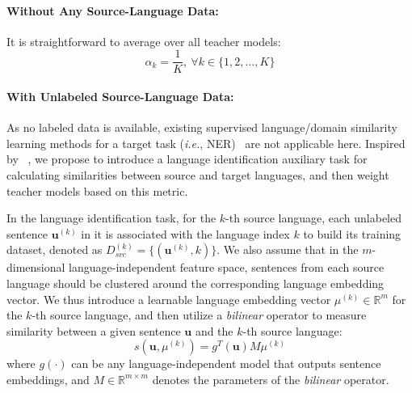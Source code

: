 \documentclass[11pt,a4paper]{article}
\newcommand\ie{\textit{i.e.}}
\begin{document}
	\paragraph{Without Any Source-Language Data: } 
It is straightforward to average over all teacher models:
	\begin{equation}
	\label{equ:minimal_resource}
	\alpha_k = \frac{1}{K}, ~\forall k \in \{1, 2, \ldots, K\}
	\end{equation}
	
	\paragraph{With Unlabeled Source-Language Data: } 
As no labeled data is available, existing supervised language/domain similarity learning methods for a target task (\ie, NER)~\cite{mcclosky2010} are not applicable here. Inspired by ~\citet{pinheiro2018unsupervised}, we propose to introduce a language identification auxiliary task for calculating similarities between source and target languages, and then weight teacher models based on this metric. 

	In the language identification task, for the $k$-th source language, each unlabeled sentence $\bm{u}^{(k)}$ in it is associated with the language index $k$ to build its training dataset, denoted as  $D^{(k)}_{src}=\{(\bm{u}^{(k)}, k)\}$. 
	We also assume that in the $m$-dimensional language-independent feature space, sentences from each source language should be clustered around the corresponding language embedding vector.  
We thus introduce a learnable language embedding vector $\mu^{(k)}\in \mathbb{R}^m$ for the $k$-th source language, and then utilize a \textit{bilinear} operator to measure similarity between a given sentence $\bm{u}$ and the $k$-th source language:
	\begin{equation}
	\label{equ:similarity}
	s(\bm{u}, \mu^{(k)}) = g^T(\bm{u})M\mu^{(k)}
	\end{equation}
	where $g(\cdot)$ can be any language-independent model that outputs sentence embeddings, and $M\in \mathbb{R}^{m\times m}$ denotes the parameters of the \textit{bilinear} operator. 
	
\end{document}
